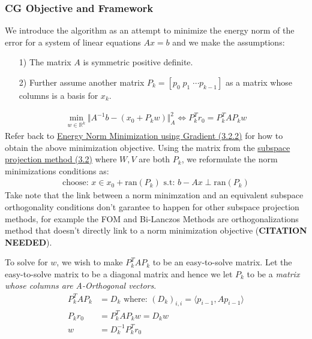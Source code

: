 \documentclass[]{article}
\theoremstyle{definition}
\begin{document}
        \subsubsection{CG Objective and Framework}
            We introduce the algorithm as an attempt to minimize the energy norm of the error for a system of linear equations $Ax = b$ and we make the assumptions: 
            \begin{itemize}
                \item [1)] The matrix $A$ is symmetric positive definite.  
                \item [2)] Further assume another matrix $P_k = [p_0 \;p_1\;\cdots p_{k-1}]$ as a matrix whose columns is a basis for $x_k$.
            \end{itemize}
            \begin{align}
                \min_{w \in \mathbb{R}^k}\Vert 
                    A^{-1}b - (x_0 + P_kw)
                \Vert_A^2 \iff P^T_kr_0 = P_k^TAP_kw
            \end{align}
            Refer back to \hyperref[sec:Energy_Norm_Minimization_using_Gradient]{Energy Norm Minimization using Gradient (3.2.2)} for how to obtain the above minimization objective. Using the matrix from the \hyperref[sec:Subspace_Projection_Methods]{subspace projection method (3.2)} where $W, V$ are both $P_k$, we reformulate the norm minimizations conditions as: 
            \begin{align}
                \text{choose: }x \in x_0 + \text{ran}(P_k) \text{ s.t: } b - Ax \perp \text{ran}(P_k)    
            \end{align}
            Take note that the link between a norm minimzation and an equivalent subspace orthogonality conditions don't garantee to happen for other subspace projection methods, for example the FOM and Bi-Lanczos Methods are orthogonalizations method that doesn't directly link to a norm minimization objective (\textbf{CITATION NEEDED}). 
            \par
            To solve for $w$, we wish to make $P_k^TAP_k$ to be an easy-to-solve matrix. Let the easy-to-solve matrix to be a diagonal matrix and hence we let $P_k$ to be a \textit{matrix whose columns are A-Orthogonal vectors}.
            \begin{align}
                P^T_kAP_k &= D_k \text{ where: } (D_k)_{i,i} = \langle p_{i - 1}, Ap_{i - 1}\rangle
                \\
                P_kr_0 &= P^T_kAP_kw = D_kw
                \\
                w &= D^{-1}_kP_k^Tr_0
            \end{align}
\end{document}
